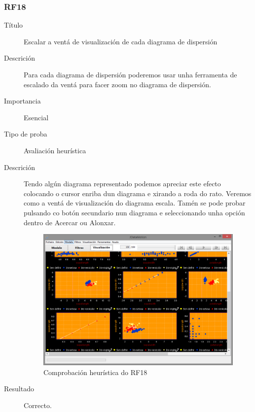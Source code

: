 \subsubsection*{RF18}
\begin{description}
\item[Título] \hfill
Escalar a ventá de visualización de cada diagrama de dispersión
\item[Descrición] \hfill
Para cada diagrama de dispersión poderemos usar unha ferramenta de escalado da ventá para facer zoom no diagrama de dispersión.
\item[Importancia] \hfill
Esencial
\item[Tipo de proba] \hfill
Avaliación heurística
\item[Descrición]
Tendo algún diagrama representado podemos apreciar este efecto colocando o cursor enriba dun diagrama e xirando a roda do rato. Veremos como a ventá de visualización do diagrama escala. Tamén se pode probar pulsando co botón secundario nun diagrama e seleccionando unha opción dentro de Acercar ou Alonxar.
\begin{figure}
\centering
\includegraphics[width=\textwidth,height=\textheight,keepaspectratio]{figuras/RF18}
\caption{Comprobación heurística do RF18}
\label{RF18}
\end{figure}
\item[Resultado]
Correcto.
\end{description}

